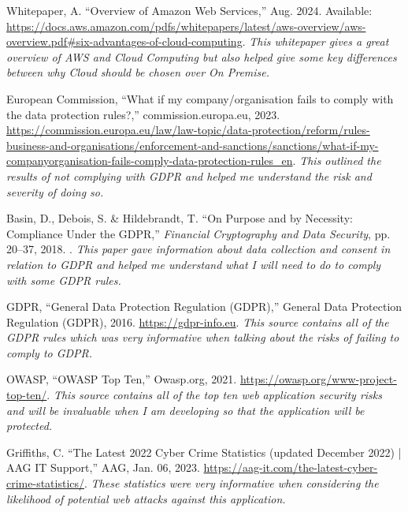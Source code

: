 \documentclass[]{project_report}
\begin{document}
\begin{thebibliography}{99}
Whitepaper, A. “Overview of Amazon Web Services,” Aug. 2024. Available: \url{https://docs.aws.amazon.com/pdfs/whitepapers/latest/aws-overview/aws-overview.pdf#six-advantages-of-cloud-computing}.
\textit{This whitepaper gives a great overview of AWS and Cloud Computing but also helped give some key differences between why Cloud should be chosen over On Premise.}

European Commission, “What if my company/organisation fails to comply with the data protection rules?,” commission.europa.eu, 2023. \url{https://commission.europa.eu/law/law-topic/data-protection/reform/rules-business-and-organisations/enforcement-and-sanctions/sanctions/what-if-my-companyorganisation-fails-comply-data-protection-rules_en}.
\textit{This outlined the results of not complying with GDPR and helped me understand the risk and severity of doing so.}


Basin, D., Debois, S. \& Hildebrandt, T. “On Purpose and by Necessity: Compliance Under the GDPR,” \emph{Financial Cryptography and Data Security}, pp. 20–37, 2018. .
\textit{This paper gave information about data collection and consent in relation to GDPR and helped me understand what I will need to do to comply with some GDPR rules.}

GDPR, “General Data Protection Regulation (GDPR),” General Data Protection Regulation (GDPR), 2016. \url{https://gdpr-info.eu}.
\textit{This source contains all of the GDPR rules which was very informative when talking about the risks of failing to comply to GDPR.}

OWASP, “OWASP Top Ten,” Owasp.org, 2021. \url{https://owasp.org/www-project-top-ten/}.
\textit{This source contains all of the top ten web application security risks and will be invaluable when I am developing so that the application will be protected.}

Griffiths, C. “The Latest 2022 Cyber Crime Statistics (updated December 2022) | AAG IT Support,” AAG, Jan. 06, 2023. \url{https://aag-it.com/the-latest-cyber-crime-statistics/}.
\textit{These statistics were very informative when considering the likelihood of potential web attacks against this application.}


\end{thebibliography}
\label{endpage}
\end{document}
